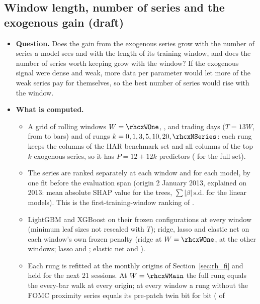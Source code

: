 \subsection{Window length, number of series and the exogenous gain (draft)}
\label{sec:rh_cx}
\begin{itemize}
\item \textbf{Question.} Does the gain from the exogenous series grow with the number of series a model sees and with
  the length of its training window, and does the number of series worth keeping grow with the window? If the
  exogenous signal were dense and weak, more data per parameter would let more of the weak series pay for themselves,
  so the best number of series would rise with the window.
\item \textbf{What is computed.}
  \begin{itemize}
  \item A grid of rolling windows $W = \rhcxWOne$, \rhcxWTwo, \rhcxWMain{} and \rhcxWLong{} trading days ($T = 13W$,
    from \rhcxTOne{} to \rhcxTLong{} bars) and of rungs $k = 0, 1, 3, 5, 10, 20, \rhcxNSeries$: each rung keeps the
    \rhcxPHar{} columns of the HAR benchmark set and all columns of the top $k$ exogenous series, so it has
    $P = 12 + 12k$ predictors (\rhcxPFull{} for the full set).
  \item The series are ranked separately at each window and for each model, by one fit before the evaluation span
    (origin 2 January 2013, explained on 2013: mean absolute SHAP value for the trees, $\sum |\beta|\,\mathrm{s.d.}$
    for the linear models). This is the first-training-window ranking of \citet{MaischZhangUlrichZimmer2026}.
  \item LightGBM and XGBoost on their frozen configurations at every window (minimum leaf sizes not rescaled with
    $T$); ridge, lasso and elastic net on each window's own frozen penalty (ridge \rhcxPenRidgeOne{} at $W =
    \rhcxWOne$, \rhcxPenRidgeMain{} at the other windows; lasso \rhcxPenLassoOne{} and \rhcxPenLassoMain; elastic net
    \rhcxPenEnetOne{} and \rhcxPenEnetMain).
  \item Each rung is refitted at the \rhcxNOrigins{} monthly origins of Section~\ref{sec:rh_fi} and held for the next
    21 sessions. At $W = \rhcxWMain$ the full rung equals the every-bar walk at every origin; at every window a rung
    without the FOMC proximity series equals its pre-patch twin bit for bit (\rhcxNGatesPass{} of \rhcxNGates{}

\end{itemize}
\end{itemize}
